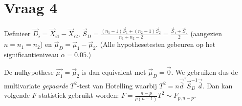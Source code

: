 \documentclass[a4paper,dutch,11pt,]{scrartcl}
\begin{document}
% 
% 
% 
% 
% 

 




\section*{Vraag 4}
Definieer $\vec{D}_i = \vec{X}_{i1} - \vec{X}_{i2}$,  $\vec{S}_D = \frac{(n_1-1)\vec{S}_1 + (n_2-1)\vec{S}_2}{n_1+n_2-2}=\frac{\vec{S}_1+\vec{S}_2}{2}$ (aangezien $n=n_1=n_2$) en $\vec{\mu}_D=\vec{\mu}_1 - \vec{\mu}_2$. (Alle hypothesetesten gebeuren op het significantieniveau $\alpha = 0.05$.)

De nulhypothese $\vec{\mu_1} = \vec{\mu}_2$ is dan equivalent met $\vec{\mu}_D = \vec{0}$.
We gebruiken dus de multivariate \emph{gepaarde} $T^2$-test van Hotelling \cite{Anderson84} waarbij $T^2 = n \vec{\overline{d}}^{\tau}\vec{S}_D^{-1}\vec{\overline{d}}$. Dan kan volgende $F$-statistiek gebruikt worden: $F=\frac{n-p}{p(n-1)}T^2\sim F_{p,n-p}$.
\end{document}
